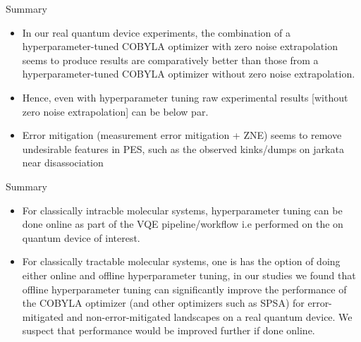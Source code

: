 \begin{frame}{Summary}
   \begin{itemize}
    \setlength\itemsep{0.1em}
    \item In our real quantum device experiments, the combination of a hyperparameter-tuned {\color{red}COBYLA} optimizer with zero noise extrapolation
          seems to produce results are comparatively better than those from a hyperparameter-tuned COBYLA optimizer without zero noise extrapolation.

    \item Hence, even with hyperparameter tuning raw experimental results [without zero noise extrapolation] can be below par.

    \item Error mitigation (measurement error mitigation + ZNE) seems to remove undesirable features in PES, such as the observed kinks/dumps on jarkata near disassociation

  \end{itemize}
\end{frame}

\begin{frame}{Summary}
   \begin{itemize}
    \setlength\itemsep{0.1em}
    \item For classically intracble molecular systems, hyperparameter tuning can be done online as part of the VQE pipeline/workflow
          i.e performed on the on quantum device of interest.

    \item For classically tractable molecular systems, one is has the option of doing either online and offline hyperparameter
          tuning, in our studies we found that offline hyperparameter tuning can significantly improve the performance
          of the {\color{red}COBYLA} optimizer (and other optimizers such as SPSA) for error-mitigated and non-error-mitigated landscapes
          on a real quantum device. We suspect that performance would be improved further if done online.
   \end{itemize}
\end{frame}

